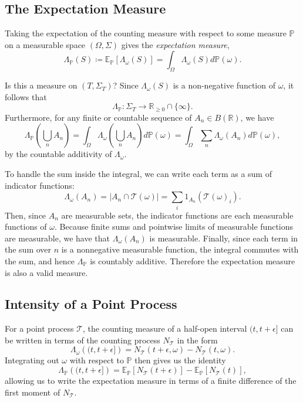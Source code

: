 \documentclass[honours,12pt]{unswthesis}
\numberwithin{equation}{section}
\begin{document}
\subsection{The Expectation Measure}
Taking the expectation of the counting measure with respect to some measure $\mathbb{P}$ on a measurable space $(\Omega,\Sigma)$ gives the \textit{expectation measure},
$$\Lambda_\mathbb{P}(S)\coloneq \mathbb{E}_\mathbb{P}\left[\Lambda_\omega(S)\right] = \int_\Omega \Lambda_\omega(S)d\mathbb{P}(\omega).$$

Is this a measure on $(T,\Sigma_T)$? Since $\Lambda_\omega(S)$ is a non-negative function of $\omega$, it follows that $$\Lambda_{\mathbb{P}} : \Sigma_T \to \mathbb{R}_{\geq 0}\cap\{\infty\}.$$ Furthermore, for any finite or countable sequence of $A_n\in B(\mathbb{R})$, we have $$\Lambda_\mathbb{P}\left(\bigcup_n A_n\right) = \int_\Omega \Lambda_\omega\left(\bigcup_n A_n\right)d\mathbb{P}(\omega) = \int_\Omega \sum_n \Lambda_\omega(A_n) d\mathbb{P}(\omega),$$
by the countable additivity of $\Lambda_\omega$.

To handle the sum inside the integral, we can write each term as a sum of indicator functions:
$$\Lambda_\omega(A_n) = \left\vert A_n\cap \mathcal{T}(\omega)\right\vert = \sum_i 1_{A_n}\left(\mathcal{T}(\omega)_i\right).$$
Then, since $A_n$ are measurable sets, the indicator functions are each measurable functions of $\omega$. Because finite sums and pointwise limits of measurable functions are measurable, we have that $\Lambda_\omega(A_n)$ is measurable.  Finally, since each term in the sum over $n$ is a nonnegative measurable function, the integral commutes with the sum, and hence $\Lambda_\mathbb{P}$ is countably additive. Therefore the expectation measure is also a valid measure.

\subsection{Intensity of a Point Process}
For a point process $\mathcal{T}$, the counting measure of a half-open interval $(t,t+\epsilon]$ can be written in terms of the counting process $N_\mathcal{T}$ in the form
$$\Lambda_\omega\left((t,t+\epsilon]\right) = N_\mathcal{T}(t+\epsilon,\omega) - N_\mathcal{T}(t,\omega).$$
Integrating out $\omega$ with respect to $\mathbb{P}$ then gives us the identity
$$\Lambda_\mathbb{P}\left((t,t+\epsilon]\right) = \mathbb{E}_\mathbb{P}\left[N_\mathcal{T}(t+\epsilon)\right] - \mathbb{E}_\mathbb{P}\left[N_\mathcal{T}(t)\right],$$
allowing us to write the expectation measure in terms of a finite difference of the first moment of $N_\mathcal{T}$.
\end{document}
